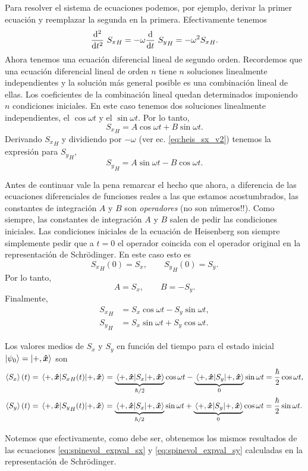 \documentclass[10pt, a4paper]{article}
\newcommand{\wt}{\omega t}
\numberwithin{equation}{subsection}
\begin{document}
Para resolver el sistema de ecuaciones podemos, por ejemplo, derivar la primer
ecuación y reemplazar la segunda en la primera. Efectivamente tenemos
\begin{equation}
  \dv[2]{t}\ {S_x}_H = -\omega\dv{t}\ {S_y}_H = -\omega^2 {S_x}_H.
\end{equation}
Ahora tenemos una ecuación diferencial lineal de segundo orden. Recordemos que
una ecuación diferencial lineal de orden $n$ tiene $n$ soluciones linealmente
independientes y la solución más general posible es una combinación lineal de
ellas. Los coeficientes de la combinación lineal quedan determinados imponiendo
$n$ condiciones iniciales. En este caso tenemos dos soluciones linealmente
independientes, el $\cos\wt$ y el $\sin\wt$. Por lo tanto,
\begin{equation}
  {S_x}_H = A\cos\wt + B\sin\wt.
\end{equation}
Derivando ${S_x}_H$ y dividiendo por $-\omega$ (ver ec. \eqref{eq:heis_sx_v2})
tenemos la expresión para ${S_y}_H$,
\begin{equation}
  {S_y}_H = A\sin\wt - B\cos\wt.
\end{equation}

Antes de continuar vale la pena remarcar el hecho que ahora, a diferencia de
las ecuaciones diferenciales de funciones reales a las que estamos
acostumbrados, las constantes de integración $A$ y $B$ son \emph{operadores}
(no son números!!). Como siempre, las constantes de integración $A$ y $B$
salen de pedir las condiciones iniciales. Las condiciones iniciales de la
ecuación de Heisenberg son siempre simplemente pedir que a $t = 0$ el operador
coincida con el operador original en la representación de Schrödinger. En este
caso esto es
\begin{equation}
  {S_x}_H(0) = S_x, \qquad {S_y}_H(0) = S_y.
\end{equation}
Por lo tanto,
\begin{equation}
  A = S_x, \qquad B = -S_y.
\end{equation}
Finalmente,
\begin{align}
  {S_x}_H &= S_x\cos\wt - S_y\sin\wt, \\
  {S_y}_H &= S_x\sin\wt + S_y\cos\wt.
\end{align}

Los valores medios de $S_x$ y $S_y$ en función del tiempo para el estado
inicial $\ket{\psi_0} = \ket{+,\vu*{x}}$ son
\begin{align}
  \expval{S_x}(t) &= \expval{{S_x}_H(t)}{+,\vers{x}} =
    \underbrace{\expval{S_x}{+,\vers{x}}}_{\hbar/2}\cos\wt -
    \underbrace{\expval{S_y}{+,\vers{x}}}_{0}\sin\wt =
    \frac{\hbar}{2}\cos\wt, \\
  \expval{S_y}(t) &= \expval{{S_y}_H(t)}{+,\vers{x}} =
    \underbrace{\expval{S_x}{+,\vers{x}}}_{\hbar/2}\sin\wt +
    \underbrace{\expval{S_y}{+,\vers{x}}}_{0}\cos\wt =
    \frac{\hbar}{2}\sin\wt.
\end{align}

Notemos que efectivamente, como debe ser, obtenemos los mismos resultados de
las ecuaciones \eqref{eq:spinevol_expval_sx} y \eqref{eq:spinevol_expval_sy}
calculadas en la representación de Schrödinger.

\end{document}
